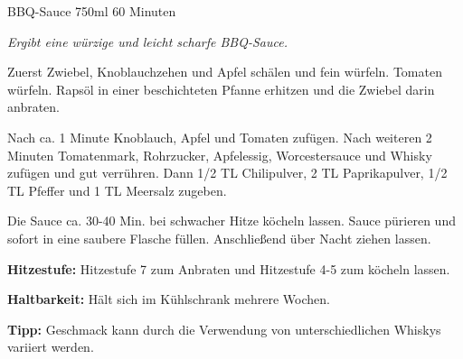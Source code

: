 \documentclass[
  DIV=11,%
  pagesize,%
  fontsize=11pt,%
  paper=a4,%
]{scrartcl}
\begin{document}
\begin{recipe}{BBQ-Sauce} {750ml} {60 Minuten}

\freeform
\textit{Ergibt eine würzige und leicht scharfe BBQ-Sauce.}


Zuerst Zwiebel, Knoblauchzehen und Apfel schälen und fein würfeln.
Tomaten würfeln.
Rapsöl in einer beschichteten Pfanne erhitzen und die Zwiebel darin anbraten.


Nach ca. 1 Minute Knoblauch, Apfel und Tomaten zufügen.
Nach weiteren 2 Minuten Tomatenmark, Rohrzucker, Apfelessig, Worcestersauce und Whisky zufügen und gut verrühren.
Dann 1/2 TL Chilipulver, 2 TL Paprikapulver, 1/2 TL Pfeffer und 1 TL Meersalz zugeben.

\newstep
Die Sauce ca. 30-40 Min. bei schwacher Hitze köcheln lassen.
Sauce pürieren und sofort in eine saubere Flasche füllen.
Anschließend über Nacht ziehen lassen.

\freeform
\hrulefill

\freeform
\textbf{Hitzestufe:}
Hitzestufe 7 zum Anbraten und Hitzestufe 4-5 zum köcheln lassen.

\freeform 
\textbf{Haltbarkeit:}
Hält sich im Kühlschrank mehrere Wochen.

\freeform 
\textbf{Tipp:}
Geschmack kann durch die Verwendung von unterschiedlichen Whiskys variiert werden.

\end{recipe}
\end{document}
